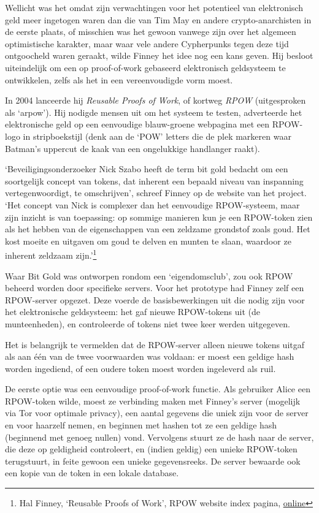 \documentclass[
  a5paper,
  smalldemyvopaper,11pt,twoside,onecolumn,openright,extrafontsizes]{memoir}
\begin{document}
Wellicht was het omdat zijn verwachtingen voor het potentieel van
elektronisch geld meer ingetogen waren dan die van Tim May en andere
crypto-anarchisten in de eerste plaats, of misschien was het gewoon
vanwege zijn over het algemeen optimistische karakter, maar waar vele
andere Cypherpunks tegen deze tijd ontgoocheld waren geraakt, wilde
Finney het idee nog een kans geven. Hij besloot uiteindelijk om een op
proof-of-work gebaseerd elektronisch geldsysteem te ontwikkelen, zelfs
als het in een vereenvoudigde vorm moest.

In 2004 lanceerde hij \emph{Reusable Proofs of Work}, of kortweg
\emph{RPOW} (uitgesproken als `arpow'). Hij nodigde mensen uit om het
systeem te testen, adverteerde het elektronische geld op een eenvoudige
blauw-groene webpagina met een RPOW-logo in stripboekstijl (denk aan de
`POW' letters die de plek markeren waar Batman's uppercut de kaak van
een ongelukkige handlanger raakt).

`Beveiligingsonderzoeker Nick Szabo heeft de term bit gold bedacht om
een soortgelijk concept van tokens, dat inherent een bepaald niveau van
inspanning vertegenwoordigt, te omschrijven', schreef Finney op de
website van het project. `Het concept van Nick is complexer dan het
eenvoudige RPOW-systeem, maar zijn inzicht is van toepassing: op sommige
manieren kun je een RPOW-token zien als het hebben van de eigenschappen
van een zeldzame grondstof zoals goud. Het kost moeite en uitgaven om
goud te delven en munten te slaan, waardoor ze inherent zeldzaam
zijn.'\footnote{Hal Finney, `Reusable Proofs of Work', RPOW website
  index pagina,
  \href{https://web.archive.org/web/20090217090451/http://rpow.net/index.html}{online}}

Waar Bit Gold was ontworpen rondom een `eigendomsclub', zou ook RPOW
beheerd worden door specifieke servers. Voor het prototype had Finney
zelf een RPOW-server opgezet. Deze voerde de basisbewerkingen uit die
nodig zijn voor het elektronische geldsysteem: het gaf nieuwe
RPOW-tokens uit (de munteenheden), en controleerde of tokens niet twee
keer werden uitgegeven.

Het is belangrijk te vermelden dat de RPOW-server alleen nieuwe tokens
uitgaf als aan één van de twee voorwaarden was voldaan: er moest een
geldige hash worden ingediend, of een oudere token moest worden
ingeleverd als ruil.

De eerste optie was een eenvoudige proof-of-work functie. Als gebruiker
Alice een RPOW-token wilde, moest ze verbinding maken met Finney's
server (mogelijk via Tor voor optimale privacy), een aantal gegevens die
uniek zijn voor de server en voor haarzelf nemen, en beginnen met hashen
tot ze een geldige hash (beginnend met genoeg nullen) vond. Vervolgens
stuurt ze de hash naar de server, die deze op geldigheid controleert, en
(indien geldig) een unieke RPOW-token terugstuurt, in feite gewoon een
unieke gegevensreeks. De server bewaarde ook een kopie van de token in
een lokale database.
\end{document}
